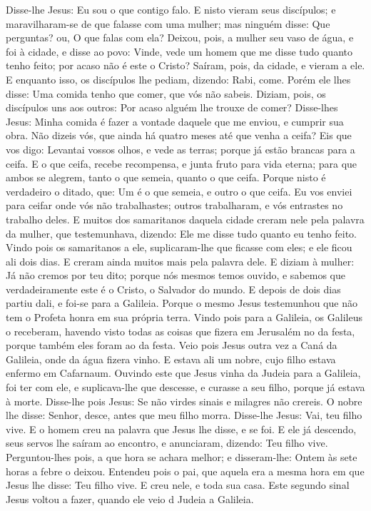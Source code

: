 {  Disse-lhe Jesus: Eu sou o que contigo falo.
  E nisto vieram seus discípulos; e maravilharam-se de que falasse com uma mulher; mas ninguém
{} disse: Que perguntas? ou, O que falas com ela?
  Deixou, pois, a mulher seu vaso de água, e foi à cidade, e disse ao povo:
  Vinde, vede um homem que me disse tudo quanto tenho feito; por acaso não é este o Cristo?
  Saíram, pois, da cidade, e vieram a ele.
  E enquanto isso, os discípulos lhe pediam, dizendo: Rabi, come.
  Porém ele lhes disse: Uma comida tenho que comer, que vós não sabeis.
  Diziam, pois, os discípulos uns aos outros: Por acaso alguém lhe trouxe de comer?
  Disse-lhes Jesus: Minha comida é fazer a vontade daquele que me enviou, e cumprir sua obra.
  Não dizeis vós, que ainda há quatro meses até que venha a ceifa? Eis que vos digo: Levantai vossos olhos, e vede as terras; porque já estão brancas para a ceifa.
  E o que ceifa, recebe recompensa, e junta fruto para vida eterna; para que ambos se alegrem, tanto o que semeia, quanto o que ceifa.
  Porque nisto é verdadeiro o ditado, que: Um é o que semeia, e outro o que ceifa.
  Eu vos enviei para ceifar onde vós não trabalhastes; outros trabalharam, e vós entrastes no trabalho deles.
  E muitos dos samaritanos daquela cidade creram nele pela palavra da mulher, que testemunhava, dizendo: Ele me disse tudo quanto eu tenho feito.
  Vindo pois os samaritanos a ele, suplicaram-lhe que ficasse com eles; e ele ficou ali dois dias.
  E creram ainda muitos mais pela palavra dele.
  E diziam à mulher: Já não cremos por teu dito; porque nós mesmos temos
{} ouvido, e sabemos que verdadeiramente este é o Cristo, o Salvador do mundo.
  E depois de dois dias partiu dali, e foi-se para a Galileia.
  Porque o mesmo Jesus testemunhou que não tem o Profeta honra em sua própria terra.
  Vindo pois para a Galileia, os Galileus o receberam, havendo visto todas as coisas que fizera em Jerusalém no
{} da festa, porque também eles foram ao
{} da festa.
  Veio pois Jesus outra vez a Caná da Galileia, onde da água fizera vinho. E estava ali um nobre, cujo filho estava enfermo em Cafarnaum.
  Ouvindo este que Jesus vinha da Judeia para a Galileia, foi ter com ele, e suplicava-lhe que descesse, e curasse a seu filho, porque já estava à morte.
  Disse-lhe pois Jesus: Se não virdes sinais e milagres não crereis.
  O nobre lhe disse: Senhor, desce, antes que meu filho morra.
  Disse-lhe Jesus: Vai, teu filho vive. E o homem creu na palavra que Jesus lhe disse, e se foi.
  E
{} ele já descendo, seus servos lhe saíram ao encontro, e
{} anunciaram, dizendo: Teu filho vive.
  Perguntou-lhes pois, a que hora se achara melhor; e disseram-lhe: Ontem às sete horas a febre o deixou.
  Entendeu pois o pai, que aquela era a mesma hora em que Jesus lhe disse: Teu filho vive. E creu nele, e toda sua casa.
  Este segundo sinal Jesus voltou a fazer, quando ele veio d
{} Judeia a Galileia.
\par }

